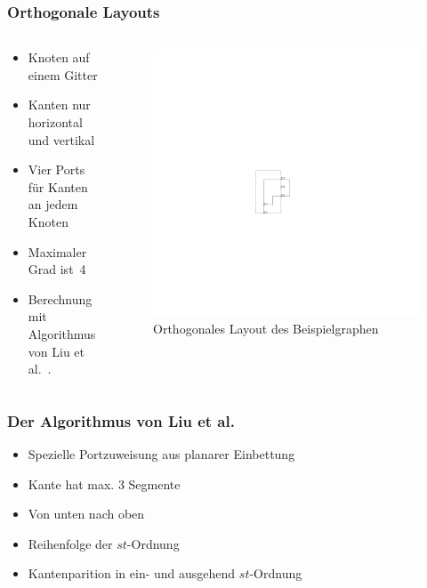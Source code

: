 \documentclass{beamer}
\begin{document}
\begin{frame}
  \frametitle{Orthogonale Layouts}
\begin{columns}[c]
\begin{column}{5cm}
  \begin{itemize}[<+->]
    \item Knoten auf einem Gitter
    \item Kanten nur horizontal und vertikal
    \item Vier Ports für Kanten an jedem Knoten
    \item Maximaler Grad ist~4
    \item Berechnung mit Algorithmus von Liu et al.~\cite{liu+etal-98}.
  \end{itemize}
\end{column}
\begin{column}{5cm}
\begin{figure}[h]
  \centering
  \includegraphics{exampleA/orthogonalNocompress}
  \caption{Orthogonales Layout des Beispielgraphen}
  \label{fig:exampleAorthogonalNocompress}
\end{figure}
\end{column}
\end{columns}
\end{frame}


\begin{frame}
  \frametitle{Der Algorithmus von Liu et al.}
  \begin{itemize}[<+->]
    \item Spezielle Portzuweisung aus planarer Einbettung
    \item Kante hat max. 3 Segmente
    \item Von unten nach oben
    \item Reihenfolge der $st$-Ordnung
    \item Kantenparition in ein- und ausgehend $st$-Ordnung
  \end{itemize}
\end{frame}
\end{document}
